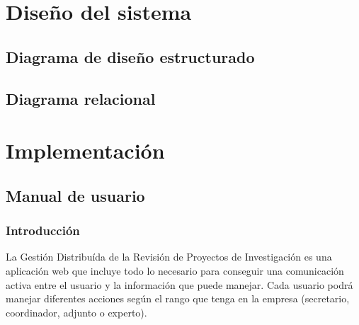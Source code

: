 \documentclass[12pt,a4paper,titlepage,spanish,twoside]{book}
\begin{document}
\part{Diseño del sistema}
\chapter{Diagrama de diseño estructurado}

\begin{sidewaystable}
\end{sidewaystable}

\begin{sidewaystable}
\end{sidewaystable}

\begin{sidewaystable}
\end{sidewaystable}

\begin{sidewaystable}
\end{sidewaystable}

\begin{sidewaystable}
\end{sidewaystable}

\begin{sidewaystable}
\end{sidewaystable}

\chapter{Diagrama relacional}
\newpage
{}

\part{Implementación}
\chapter{Manual de usuario}
\section{Introducción}
La Gestión Distribuída de la Revisión de Proyectos de Investigación es una
aplicación web que incluye todo lo necesario para conseguir una comunicación 
activa entre el usuario y la información que puede manejar. Cada usuario podrá 
manejar diferentes acciones según el rango que tenga en la empresa (secretario,
coordinador, adjunto o experto).
\end{document}
